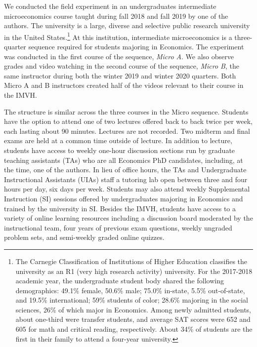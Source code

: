 \documentclass[12pt]{article}
\begin{document}
We conducted the field experiment in an undergraduates intermediate microeconomics course taught during fall 2018 and fall 2019 by one of the authors. The university is a large, diverse and selective public research university in the United States.\footnote{The Carnegie Classification of Institutions of Higher Education classifies the university as an R1 (very high research activity) university. For the 2017-2018 academic year, the undergraduate student body shared the following demographics: 49.1\% female, 50.6\% male; 75.0\% in-state, 5.5\% out-of-state, and 19.5\% international; 59\% students of color; 28.6\% majoring in the social sciences, 26\% of which major in Economics. Among newly admitted students, about one-third were transfer students, and average SAT scores were 652 and 605 for math and critical reading, respectively. About 34\% of students are the first in their family to attend a four-year university.} At this institution, intermediate microeconomics is a three-quarter sequence required for students majoring in Economics. The experiment was conducted in the first course of the sequence, \textit{Micro A}. We also observe grades and video watching in the second course of the sequence, \textit{Micro B}, the same instructor during both the winter 2019 and winter 2020 quarters. Both Micro A and B instructors created half of the videos relevant to their course in the IMVH.


The structure is similar across the three courses in the Micro sequence. Students have the option to attend one of two lectures offered back to back twice per week, each lasting about 90 minutes. Lectures are not recorded. Two midterm and final exams are held at a common time outside of lecture. In addition to lecture, students have access to weekly one-hour discussion sections run by graduate teaching assistants (TAs) who are all Economics PhD candidates, including, at the time, one of the authors. In lieu of office hours, the TAs and Undergraduate Instructional Assistants (UIAs) staff a tutoring lab open between three and four hours per day, six days per week. Students may also attend weekly Supplemental Instruction (SI) sessions offered by undergraduates majoring in Economics and trained by the university in SI. Besides the IMVH, students have access to a variety of online learning resources including a discussion board moderated by the instructional team, four years of previous exam questions, weekly ungraded problem sets, and semi-weekly graded online quizzes.
\end{document}
